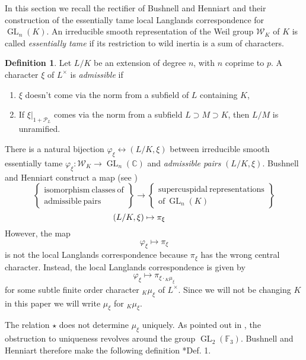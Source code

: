 \documentclass{compositio}
\theoremstyle{plain}
\theoremstyle{definition}
\newtheorem{definition}[theorem]{Definition}
\numberwithin{equation}{section}
\DeclareMathOperator{\GL}{GL}
\newcommand{\PL}{\mathcal{P}_L}
\newcommand{\Lx}{L^\times}
\newcommand{\Weil}{\mathcal{W}}
\begin{document}
In this section we recall the rectifier of Bushnell and Henniart and their construction of the
essentially tame local Langlands correspondence for $\GL_{n}(K)$.
An irreducible smooth representation of the Weil group $\Weil_K$ of $K$ is
called \emph{essentially tame} if its restriction to wild inertia is a
sum of characters.
\begin{definition}\label{admissiblepairhowe}
Let $L/K$ be an extension of degree $n$, with $n$ coprime to $p$.  A character
$\xi$ of $L^\times$ is \emph{admissible} if
\begin{enumerate}
\item $\xi$ doesn't come via the norm from a subfield of $L$ containing $K$,
\item If $\xi|_{1 + \PL}$ comes via the norm from a subfield $L \supset M \supset K$, then
$L/M$ is unramified.
\end{enumerate}
\end{definition}
There is a natural bijection
$\varphi_{\xi} \leftrightarrow (L/K, \xi)$ between irreducible smooth essentially tame
$\varphi_{\xi} : \Weil_K \rightarrow \GL_{n}(\mathbb{C})$ and
\emph{admissible pairs} $(L/K, \xi)$.
Bushnell and Henniart
construct a map (see \cite{bushnell-henniart:10a})
\begin{equation*}
\left\{
\begin{array}{cc}
\mathrm{isomorphism \ classes \ of} \\
\mathrm{admissible \ pairs}
\end{array}
\right\} \rightarrow \left\{
\begin{array}{cc}
\mathrm{supercuspidal \ representations} \\
\mathrm{of} \ \GL_{n}(K)
\end{array} \right\}
\end{equation*}
$$\hspace{-.5in} (L/K, \xi) \mapsto \pi_{\xi}$$
However, the map $$\varphi_{\xi} \mapsto \pi_{\xi}$$
is not the local Langlands
correspondence because $\pi_{\xi}$ has the wrong central character.
Instead, the local Langlands correspondence is given by
\begin{equation}\label{llcgln}
\varphi_{\xi} \mapsto \pi_{\xi \cdot {}_K \mu_{\xi}} \tag{$\star$}
\end{equation}
for some subtle finite order
character ${}_K \mu_{\xi}$ of $\Lx$.  Since we will not be changing $K$
in this paper we will write $\mu_\xi$ for ${}_K \mu_{\xi}$.

The relation $\star$ does not determine $\mu_{\xi}$ uniquely.  As pointed out
in \cite{bushnell-henniart:10a}, the obstruction to uniqueness revolves around the
group $\GL_2(\mathbb{F}_3)$.  Bushnell and Henniart therefore make the following definition \cite{bushnell-henniart:10a}*{Def. 1}.
\end{document}
